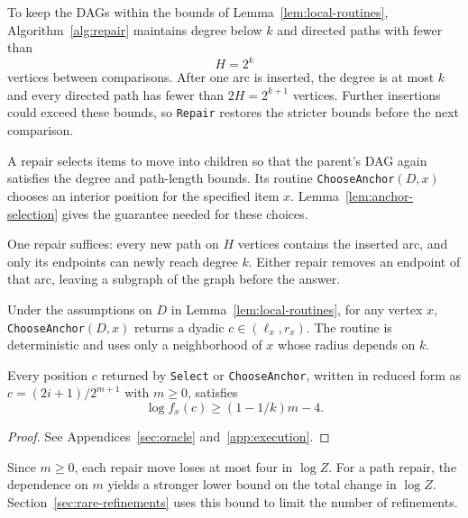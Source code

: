 To keep the DAGs within the bounds of Lemma~\ref{lem:local-routines},
Algorithm~\ref{alg:repair} maintains degree below $k$ and directed paths
with fewer than
\begin{equation}\label{eq:path-threshold}
H=2^k
\end{equation}
vertices between comparisons. After one arc is inserted, the degree is
at most $k$ and every directed path has fewer than $2H=2^{k+1}$ vertices.
Further insertions could exceed these bounds, so \texttt{Repair} restores
the stricter bounds before the next comparison.

A repair selects items to move into children so that the parent's DAG
again satisfies the degree and path-length bounds. Its routine
\texttt{ChooseAnchor}$(D,x)$ chooses an interior position for the
specified item $x$. Lemma~\ref{lem:anchor-selection} gives the guarantee
needed for these choices.

\begin{algorithm}[H]
\caption{\texttt{Repair}$(v)$: restore the graph bounds after an answer.}
\label{alg:repair}
\DontPrintSemicolon
{}
\end{algorithm}

One repair suffices: every new path on $H$ vertices contains the inserted
arc, and only its endpoints can newly reach degree $k$. Either repair
removes an endpoint of that arc, leaving a subgraph of the graph before
the answer.

\begin{lemma}\label{lem:anchor-selection}
Under the assumptions on $D$ in Lemma~\ref{lem:local-routines},
for any vertex $x$, \textnormal{\texttt{ChooseAnchor}}$(D,x)$ returns a dyadic
$c\in(\ell_x,r_x)$. The routine is deterministic and uses only a
neighborhood of $x$ whose radius depends on $k$.

Every position $c$ returned by \textnormal{\texttt{Select}} or
\textnormal{\texttt{ChooseAnchor}}, written in reduced form as
$c=(2i+1)/2^{m+1}$ with $m\ge0$, satisfies
\begin{equation}\label{eq:tariff}
\log f_x(c)\ge(1-1/k)m-4.
\end{equation}
\end{lemma}
\begin{proof}
See Appendices~\ref{sec:oracle} and~\ref{app:execution}.
\end{proof}

Since $m\ge0$, each repair move loses at most four in $\log Z$.
For a path repair, the dependence on $m$ yields a stronger lower bound
on the total change in $\log Z$. Section~\ref{sec:rare-refinements} uses
this bound to limit the number of refinements.
